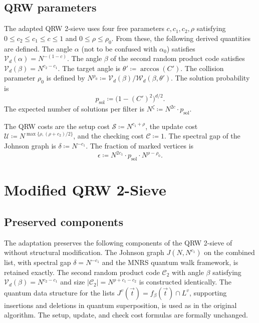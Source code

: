 \documentclass[10pt,a4paper]{article}
\begin{document}
\subsection{QRW parameters}
\label{sec:qrw-params}

The adapted QRW 2-sieve uses four free parameters \(c, c_1, c_2, \rho\) satisfying \(0 \le c_2 \le c_1 \le c \le 1\) and \(0 \le \rho \le \rho_0\). From these, the following derived quantities are defined. The angle \(\alpha\) (not to be confused with \(\alpha_0\)) satisfies \(\mathcal{V}_d(\alpha) = N^{-(1-c)}\). The angle \(\beta\) of the second random product code satisfies \(\mathcal{V}_d(\beta) = N^{c_2-c_1}\). The target angle is \(\theta' \coloneqq \arccos(C')\). The collision parameter \(\rho_0\) is defined by \(N^{\rho_0} \coloneqq \mathcal{V}_d(\beta)/\mathcal{W}_d(\beta,\theta')\). The solution probability is
\begin{equation}
p_{\mathrm{sol}} \coloneqq \bigl(1-(C')^2\bigr)^{d/2}.
\label{eq:psol}
\end{equation}
The expected number of solutions per filter is \(N^\zeta \coloneqq N^{2c}\cdot p_{\mathrm{sol}}\).

The QRW costs are the setup cost \(\mathcal{S} \coloneqq N^{c_1+\rho}\), the update cost \(\mathcal{U} \coloneqq N^{\max\{\rho,(\rho+c_2)/2\}}\), and the checking cost \(\mathcal{C} \coloneqq 1\). The spectral gap of the Johnson graph is \(\delta \coloneqq N^{-c_1}\). The fraction of marked vertices is
\begin{equation}
\epsilon \coloneqq N^{2c_1}\cdot p_{\mathrm{sol}}\cdot N^{\rho-\rho_0}.
\end{equation}

\section{Modified QRW 2-Sieve}

\subsection{Preserved components}

The adaptation preserves the following components of the QRW 2-sieve of \cite{CL21} without structural modification. The Johnson graph \(J(N, N^{c_1})\) on the combined list, with spectral gap \(\delta = N^{-c_1}\) and the MNRS quantum walk framework, is retained exactly. The second random product code \(\mathcal{C}_2\) with angle \(\beta\) satisfying \(\mathcal{V}_d(\beta) = N^{c_2-c_1}\) and size \(|\mathcal{C}_2| = N^{\rho+c_1-c_2}\) is constructed identically. The quantum data structure for the lists \(J^v(\vec{t}) = f_\beta(\vec{t})\cap L^v\), supporting insertions and deletions in quantum superposition, is used as in the original algorithm. The setup, update, and check cost formulas are formally unchanged.
\end{document}
